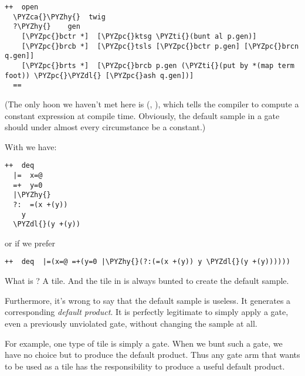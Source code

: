 \begin{framed_shaded}
\begin{Verbatim}[fontsize=\relsize{-2.5},fontseries=b,commandchars=\\\{\}]
++  open
  \PYZca{}\PYZhy{}  twig
  ?\PYZhy{}    gen
    [\PYZpc{}bctr *]  [\PYZpc{}ktsg \PYZti{}(bunt al p.gen)]
    [\PYZpc{}brcb *]  [\PYZpc{}tsls [\PYZpc{}bctr p.gen] [\PYZpc{}brcn q.gen]]
    [\PYZpc{}brts *]  [\PYZpc{}brcb p.gen (\PYZti{}(put by *(map term foot)) \PYZpc{}\PYZdl{} [\PYZpc{}ash q.gen])]
  ==
\end{Verbatim}
\end{framed_shaded}
(The only hoon we haven't met here is \kode{\ket \sig } (, ),
which tells the compiler to compute a constant expression at
compile time.  Obviously, the default sample in a gate should
under almost every circumstance be a constant.)

With \kode{\textbar{}=} we have:

\begin{framed_shaded}
\begin{Verbatim}[fontsize=\relsize{-2.5},fontseries=b,commandchars=\\\{\}]
++  deq
  |=  x=@
  =+  y=0
  |\PYZhy{}  
  ?:  =(x +(y))
    y
  \PYZdl{}(y +(y))
\end{Verbatim}
\end{framed_shaded}
or if we prefer

\begin{framed_shaded}
\begin{Verbatim}[fontsize=\relsize{-2.5},fontseries=b,commandchars=\\\{\}]
++  deq  |=(x=@ =+(y=0 |\PYZhy{}(?:(=(x +(y)) y \PYZdl{}(y +(y))))))
\end{Verbatim}
\end{framed_shaded}
What is ?  A tile.  And the tile in \kode{\textbar{}=} is always bunted to
create the default sample.  

Furthermore, it's wrong to say that the default sample is
useless.  It generates a corresponding \emph{default product}.  It is
perfectly legitimate to simply apply a gate, even a previously
unviolated gate, without changing the sample at all.

For example, one type of tile is simply a gate.  When we bunt
such a gate, we have no choice but to produce the default
product.  Thus any gate arm that wants to be used as a tile
has the responsibility to produce a useful default product.

